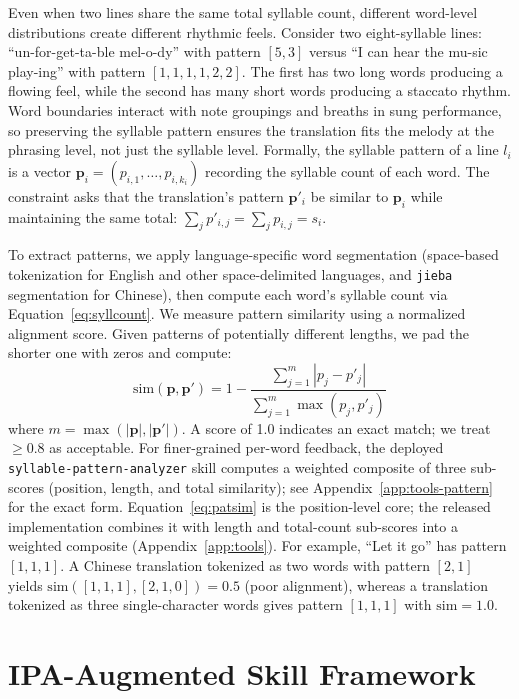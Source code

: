 \documentclass[11pt]{article}
\begin{document}
Even when two lines share the same total syllable count, different word-level distributions create different rhythmic feels.
Consider two eight-syllable lines: ``un-for-get-ta-ble mel-o-dy'' with pattern $[5, 3]$ versus ``I can hear the mu-sic play-ing'' with pattern $[1, 1, 1, 1, 2, 2]$.
The first has two long words producing a flowing feel, while the second has many short words producing a staccato rhythm.
Word boundaries interact with note groupings and breaths in sung performance, so preserving the syllable pattern ensures the translation fits the melody at the phrasing level, not just the syllable level.
Formally, the syllable pattern of a line $l_i$ is a vector $\mathbf{p}_i = (p_{i,1}, \ldots, p_{i,k_i})$ recording the syllable count of each word. The constraint asks that the translation's pattern $\mathbf{p}'_i$ be similar to $\mathbf{p}_i$ while maintaining the same total: $\sum_j p'_{i,j} = \sum_j p_{i,j} = s_i$.

To extract patterns, we apply language-specific word segmentation (space-based tokenization for English and other space-delimited languages, and \texttt{jieba} segmentation for Chinese), then compute each word's syllable count via Equation~\ref{eq:syllcount}.
We measure pattern similarity using a normalized alignment score.
Given patterns of potentially different lengths, we pad the shorter one with zeros and compute:
\begin{equation}
    \text{sim}(\mathbf{p}, \mathbf{p}') = 1 - \frac{\sum_{j=1}^{m} |p_j - p'_j|}{\sum_{j=1}^{m} \max(p_j, p'_j)}
    \label{eq:patsim}
\end{equation}
where $m = \max(|\mathbf{p}|, |\mathbf{p}'|)$.
A score of 1.0 indicates an exact match; we treat $\geq 0.8$ as acceptable.
For finer-grained per-word feedback, the deployed \texttt{syllable-pattern-analyzer} skill computes a weighted composite of three sub-scores (position, length, and total similarity); see Appendix~\ref{app:tools-pattern} for the exact form.
Equation~\ref{eq:patsim} is the position-level core; the released implementation combines it with length and total-count sub-scores into a weighted composite (Appendix~\ref{app:tools}).
For example, ``Let it go'' has pattern $[1, 1, 1]$.
A Chinese translation tokenized as two words with pattern $[2, 1]$ yields $\text{sim}([1,1,1], [2,1,0]) = 0.5$ (poor alignment), whereas a translation tokenized as three single-character words gives pattern $[1, 1, 1]$ with $\text{sim} = 1.0$.

\section{IPA-Augmented Skill Framework}
\label{sec:framework}
\end{document}
